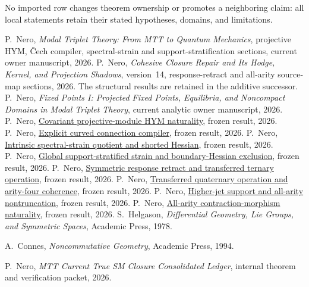 \documentclass[11pt]{article}
\newcommand{\frozenresult}[2]{\href{https://github.com/PeterNero/mtt-results-repro/blob/f141a20ea23c5c3ff19cc2161c0e226e29ade8a7/release/results/#1/artifact.json}{#2}}
\begin{document}
No imported row changes theorem ownership or promotes a neighboring claim: all local statements retain their stated hypotheses, domains, and limitations.

\begin{thebibliography}{99}
 P.~Nero, \emph{Modal Triplet Theory: From MTT to Quantum Mechanics}, projective HYM, \v{C}ech compiler, spectral-strain and support-stratification sections, current owner manuscript, 2026.
 P.~Nero, \emph{Cohesive Closure Repair and Its Hodge, Kernel, and Projection Shadows}, version~14, response-retract and all-arity source-map sections, 2026. The structural results are retained in the additive successor.
 P.~Nero, \emph{Fixed Points I: Projected Fixed Points, Equilibria, and Noncompact Domains in Modal Triplet Theory}, current analytic owner manuscript, 2026.
 P.~Nero, \frozenresult{q79_projective_hym_naturality}{Covariant projective-module HYM naturality}, frozen result, 2026.
 P.~Nero, \frozenresult{q79_cech_projector_compiler}{Explicit curved connection compiler}, frozen result, 2026.
 P.~Nero, \frozenresult{q79_spectral_strain_hessian}{Intrinsic spectral-strain quotient and shorted Hessian}, frozen result, 2026.
 P.~Nero, \frozenresult{q79_support_stratified_strain}{Global support-stratified strain and boundary-Hessian exclusion}, frozen result, 2026.
 P.~Nero, \frozenresult{causal_base_q79_symmetric_response_retraction_transferred_m3_packet}{Symmetric response retract and transferred ternary operation}, frozen result, 2026.
 P.~Nero, \frozenresult{causal_base_q79_symmetric_response_transferred_m4_packet}{Transferred quaternary operation and arity-four coherence}, frozen result, 2026.
 P.~Nero, \frozenresult{causal_base_q79_higher_transfer_jet_filtration_and_m5_feasibility_packet}{Higher-jet support and all-arity nontruncation}, frozen result, 2026.
 P.~Nero, \frozenresult{causal_base_q79_all_arity_source_promotion_packet}{All-arity contraction-morphism naturality}, frozen result, 2026.
S.~Helgason, \emph{Differential Geometry, Lie Groups, and Symmetric Spaces},
Academic Press, 1978.

A.~Connes, \emph{Noncommutative Geometry}, Academic Press, 1994.

P.~Nero, \emph{MTT Current True SM Closure Consolidated Ledger}, internal
theorem and verification packet, 2026.


\end{thebibliography}
\end{document}
